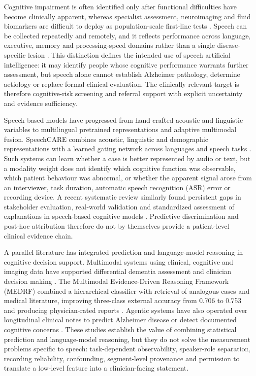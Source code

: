 \documentclass[pdflatex,sn-nature]{sn-jnl}
\begin{document}
Cognitive impairment is often identified only after functional difficulties have become clinically apparent, whereas specialist assessment, neuroimaging and fluid biomarkers are difficult to deploy as population-scale first-line tests \cite{Xue2024,Verghese2024}. Speech can be collected repeatedly and remotely, and it reflects performance across language, executive, memory and processing-speed domains rather than a single disease-specific lesion \cite{Heitz2026}. This distinction defines the intended use of speech artificial intelligence: it may identify people whose cognitive performance warrants further assessment, but speech alone cannot establish Alzheimer pathology, determine aetiology or replace formal clinical evaluation. The clinically relevant target is therefore cognitive-risk screening and referral support with explicit uncertainty and evidence sufficiency.

Speech-based models have progressed from hand-crafted acoustic and linguistic variables to multilingual pretrained representations and adaptive multimodal fusion. SpeechCARE combines acoustic, linguistic and demographic representations with a learned gating network across languages and speech tasks \cite{Azadmaleki2025}. Such systems can learn whether a case is better represented by audio or text, but a modality weight does not identify which cognitive function was observable, which patient behaviour was abnormal, or whether the apparent signal arose from an interviewer, task duration, automatic speech recognition (ASR) error or recording device. A recent systematic review similarly found persistent gaps in stakeholder evaluation, real-world validation and standardized assessment of explanations in speech-based cognitive models \cite{Shankar2025}. Predictive discrimination and post-hoc attribution therefore do not by themselves provide a patient-level clinical evidence chain.

A parallel literature has integrated prediction and language-model reasoning in cognitive decision support. Multimodal systems using clinical, cognitive and imaging data have supported differential dementia assessment and clinician decision making \cite{Qiu2022,Xue2024}. The Multimodal Evidence-Driven Reasoning Framework (MEDRF) combined a hierarchical classifier with retrieval of analogous cases and medical literature, improving three-class external accuracy from 0.706 to 0.753 and producing physician-rated reports \cite{Hu2026}. Agentic systems have also operated over longitudinal clinical notes to predict Alzheimer disease or detect documented cognitive concerns \cite{Li2025,Tian2026}. These studies establish the value of combining statistical prediction and language-model reasoning, but they do not solve the measurement problems specific to speech: task-dependent observability, speaker-role separation, recording reliability, confounding, segment-level provenance and permission to translate a low-level feature into a clinician-facing statement.
\end{document}
